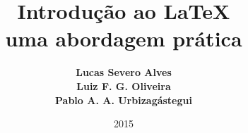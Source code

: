 
\title[Introdução ao \LaTeX]
{\textbf{\Large{Introdução ao \LaTeX}\\ uma abordagem prática}
}

\author[Lucas, Luiz, Pablo]{\textbf{Lucas Severo Alves\\
				Luiz F. G. Oliveira\\
				Pablo A. A. Urbizagástegui}} %
\date{2015} %